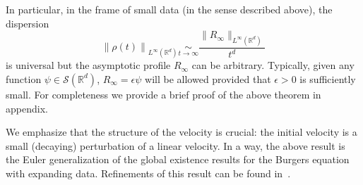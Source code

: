 \documentclass[10pt]{amsart}
\theoremstyle{definition}\newtheorem{defi}[theo]{Definition}\newtheorem{rema}[theo]{Remark}\newtheorem{exam}[theo]{Example}\newtheorem{exem}[theo]{Example}\newtheorem{nota}[theo]{Notation}
\newcommand*\R{\mathbb{R}}
\newcommand*\Sch{\mathcal{S}}
\newcommand*\<{\left\langle}
\renewcommand*\>{\right\rangle}
\newcommand*\Eq[2]{\mathop{\sim}\limits_{#1\rightarrow#2}}
\begin{document}
In particular, in the frame of small data (in the sense described above), the dispersion
\begin{equation*}
\left\| \rho(t)\right\|_{L^\infty(\R^d)}\Eq t \infty \frac{\|R_\infty\|_{L^\infty(\R^d)}}{t^d}
\end{equation*}
is universal but the asymptotic profile $R_\infty$ can be arbitrary. Typically, given any function $\psi\in \Sch(\R^d)$, $R_\infty= \epsilon \psi$ will be allowed provided that $\epsilon>0$ is sufficiently small. For completeness we provide a brief proof of the above theorem in appendix.

We emphasize that the structure of the velocity is crucial: the initial velocity is a small (decaying) perturbation of a linear velocity. In a way, the above result is the Euler generalization of the global existence results for the Burgers equation with expanding data. Refinements of this result can be found in~\cite{GrSe97,Gra98,Serre2017}.
\end{document}
